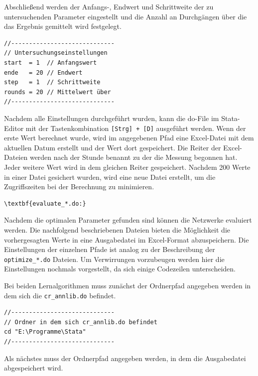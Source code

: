 Abschließend werden der Anfangs-, Endwert und Schrittweite der zu untersuchenden Parameter eingestellt und die Anzahl an Durchgängen über die das Ergebnis gemittelt wird festgelegt.

{
\begin{lstlisting}[firstnumber=270]
//-----------------------------
// Untersuchungseinstellungen
start  = 1  // Anfangswert
ende   = 20 // Endwert
step   = 1  // Schrittweite
rounds = 20 // Mittelwert über
//-----------------------------
\end{lstlisting}
}

Nachdem alle Einstellungen durchgeführt wurden, kann die do-File im Stata-Editor mit der Tastenkombination \verb|[Strg] + [D]| ausgeführt werden. Wenn der erste Wert berechnet wurde, wird im angegebenen Pfad eine Excel-Datei mit dem aktuellen Datum erstellt und der Wert dort gespeichert. Die Reiter der Excel-Dateien werden nach der Stunde benannt zu der die Messung begonnen hat. Jeder weitere Wert wird in dem gleichen Reiter gespeichert. Nachdem 200 Werte in einer Datei gesichert wurden, wird eine neue Datei erstellt, um die Zugriffszeiten bei der Berechnung zu minimieren.\\


\begin{Verbatim}[commandchars=\\\{\}]
\textbf{evaluate_*.do:}
\end{Verbatim}
Nachdem die optimalen Parameter gefunden sind können die Netzwerke evaluiert werden. Die nachfolgend beschriebenen Dateien bieten die Möglichkeit die vorhergesagten Werte in eine Ausgabedatei im Excel-Format abzuspeichern.
Die Einstellungen der einzelnen Pfade ist analog zu der Beschreibung der \verb|optimize_*.do| Dateien. Um Verwirrungen vorzubeugen werden hier die Einstellungen nochmals vorgestellt, da sich einige Codezeilen unterscheiden.

Bei beiden Lernalgorithmen muss zunächst der Ordnerpfad angegeben werden in dem sich die \verb|cr_annlib.do| befindet.

{
\begin{lstlisting}[firstnumber=4]
//-----------------------------
// Ordner in dem sich cr_annlib.do befindet
cd "E:\Programme\Stata"
//-----------------------------
\end{lstlisting}
}

Als nächstes muss der Ordnerpfad angegeben werden, in dem die Ausgabedatei abgespeichert wird. 

